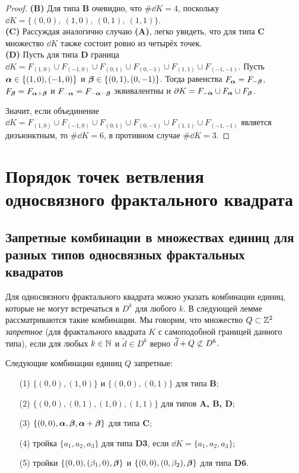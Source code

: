 \begin{proof}
{\bf (B)} Для типа {\bf B} очевидно, что $\#\dd K=4$, поскольку $\dd K=\{(0,0),\ (1,0),\ (0,1),\ (1,1)\}$.\\

{\bf (C)} Рассуждая аналогично случаю {\bf (A)}, легко увидеть, что для типа {\bf C} множество $\dd K$ также состоит ровно из четырёх точек. \\

{\bf (D)} Пусть для типа {\bf D} граница $\dd K=F_{(1,0)}\cup F_{(-1,0)}\cup F_{(0,1)}\cup F_{(0,-1)}\cup F_{(1,1)}\cup F_{(-1,-1)}$.
Пусть ${\bm{\alpha}}\in\{(1,0),(-1,0)\}$ и ${\bm{\beta}}\in\{(0,1),(0,-1)\}$.
Тогда равенства $F_{\bm{\alpha}}=F_{-{\bm{\beta}}}$, $F_{{\bm{\beta}}}=F_{{\bm{\alpha}}+{\bm{\beta}}}$ и $F_{-{\bm{\alpha}}}=F_{-{\bm{\alpha}}-{\bm{\beta}}}$ эквивалентны и $\partial K=F_{-{\bm{\alpha}}}\cup F_{\bm{\alpha}}\cup F_{\bm{\beta}}$. 

Значит, если объединение $\dd K=F_{(1,0)}\cup F_{(-1,0)}\cup F_{(0,1)}\cup F_{(0,-1)}\cup F_{(1,1)}\cup F_{(-1,-1)}$ является дизъюнктным, то $\#\dd K=6$, в противном случае $\#\dd K=3$.
\end{proof}


\section{Порядок точек ветвления односвязного фрактального квадрата}

\subsection{Запретные комбинации в множествах единиц для разных типов односвязных фрактальных квадратов}

Для односвязного фрактального квадрата можно указать комбинации единиц, которые не могут встречаться в $D^k$ для любого $k$. 
В следующей лемме рассматриваются такие комбинации. 
Мы говорим, что множество $Q\subset \mathbb{Z}^2$ {\em  запретное} (для фрактального квадрата $K$ с самоподобной границей данного типа), если для любых $k\in\mathbb{N}$ и $\widetilde d\in D^k$ верно
$\widetilde d+Q\not\subset D^k.$

\begin{lemma}\label{quadruples}
Следующие комбинации единиц $Q$ запретные:
\begin{itemize}[nolistsep]
\item[(1)] $\{(0,0), (1,0)\} $ и $\{(0,0), (0,1)\} $ для типа {\bf B};
\item[(2)] $\{(0,0), (0,1), (1,0), (1,1)\}$ для типов {\bf A, B, D};
\item[(3)] $\{(0,0),{\bm{\alpha}},{\bm{\beta}},{\bm{\alpha}}+{\bm{\beta}}\}$ для типа {\bf C};
\item[(4)] тройка $\{a_1, a_2, a_3\}$ для типа {\bf D3}, если $\dd K=\{a_1,a_2, a_3\}$;
\item[(5)] тройки $\{(0,0),(\beta_1,0),{\bm{\beta}}\}$ и $\{(0,0),(0,\beta_2),{\bm{\beta}}\}$ для типа {\bf D6}. 
\end{itemize}
\end{lemma}

